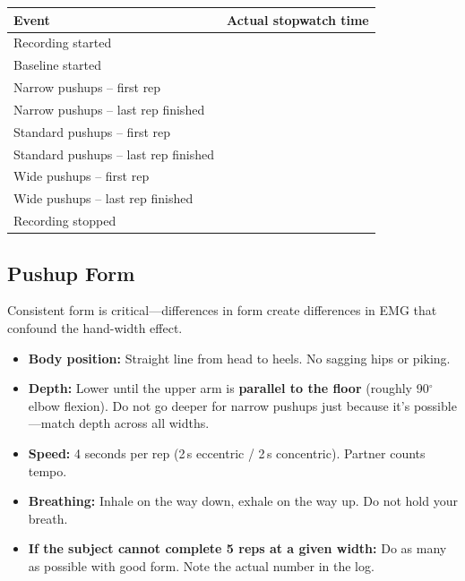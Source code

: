 \documentclass[11pt,letterpaper]{article}
\begin{document}
\begin{center}
\renewcommand{\arraystretch}{1.5}
\begin{tabular}{@{} l c @{}}
\toprule
\textbf{Event} & \textbf{Actual stopwatch time} \\
\midrule
Recording started                    & \underline{\hspace{3cm}} \\
Baseline started                     & \underline{\hspace{3cm}} \\
Narrow pushups -- first rep          & \underline{\hspace{3cm}} \\
Narrow pushups -- last rep finished  & \underline{\hspace{3cm}} \\
Standard pushups -- first rep        & \underline{\hspace{3cm}} \\
Standard pushups -- last rep finished & \underline{\hspace{3cm}} \\
Wide pushups -- first rep            & \underline{\hspace{3cm}} \\
Wide pushups -- last rep finished    & \underline{\hspace{3cm}} \\
Recording stopped                    & \underline{\hspace{3cm}} \\
\bottomrule
\end{tabular}
\end{center}

\subsection{Pushup Form}

Consistent form is critical---differences in form create differences in EMG that confound the hand-width effect.

\begin{itemize}[nosep]
    \item \textbf{Body position:} Straight line from head to heels.  No sagging hips or piking.
    \item \textbf{Depth:} Lower until the upper arm is \textbf{parallel to the floor} (roughly 90$^\circ$ elbow flexion).  Do not go deeper for narrow pushups just because it's possible---match depth across all widths.
    \item \textbf{Speed:} 4 seconds per rep (2\,s eccentric / 2\,s concentric).  Partner counts tempo.
    \item \textbf{Breathing:} Inhale on the way down, exhale on the way up.  Do not hold your breath.
    \item \textbf{If the subject cannot complete 5 reps at a given width:} Do as many as possible with good form.  Note the actual number in the log.
\end{itemize}
\end{document}
